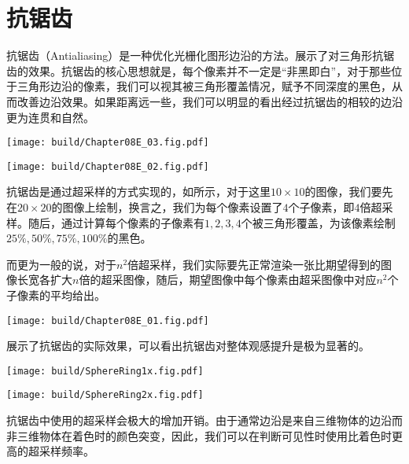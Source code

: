 \section{抗锯齿}
抗锯齿（Antialiasing）是一种优化光栅化图形边沿的方法。展示了对三角形抗锯齿的效果。抗锯齿的核心思想就是，每个像素并不一定是“非黑即白”，对于那些位于三角形边沿的像素，我们可以视其被三角形覆盖情况，赋予不同深度的黑色，从而改善边沿效果。如果距离远一些，我们可以明显的看出经过抗锯齿的相较的边沿更为连贯和自然。

\begin{Figure}[抗锯齿的效果对比]
    \begin{FigureSub}[抗锯齿前]
        \texttt{[image: build/Chapter08E\_03.fig.pdf]}
    \end{FigureSub}
    \begin{FigureSub}[抗锯齿后]
        \texttt{[image: build/Chapter08E\_02.fig.pdf]}
    \end{FigureSub}
\end{Figure}

抗锯齿是通过超采样的方式实现的，如所示，对于这里$10\times 10$的图像，我们要先在$20\times 20$的图像上绘制，换言之，我们为每个像素设置了$4$个子像素，即$4$倍超采样。随后，通过计算每个像素的子像素有$1,2,3,4$个被三角形覆盖，为该像素绘制$25\%,50\%,75\%,100\%$的黑色。

而更为一般的说，对于$n^2$倍超采样，我们实际要先正常渲染一张比期望得到的图像长宽各扩大$n$倍的超采图像，随后，期望图像中每个像素由超采图像中对应$n^2$个子像素的平均给出。

\begin{Figure}[抗锯齿与超采样]
    \texttt{[image: build/Chapter08E\_01.fig.pdf]}
\end{Figure}

展示了抗锯齿的实际效果，可以看出抗锯齿对整体观感提升是极为显著的。

\begin{Figure}[抗锯齿的实际效果]
    \begin{FigureSub}[无抗锯齿]
        \texttt{[image: build/SphereRing1x.fig.pdf]}
    \end{FigureSub}
    \hspace{0.5cm}
    \begin{FigureSub}[有抗锯齿]
        \texttt{[image: build/SphereRing2x.fig.pdf]}
    \end{FigureSub}
\end{Figure}


抗锯齿中使用的超采样会极大的增加开销。由于通常边沿是来自三维物体的边沿而非三维物体在着色时的颜色突变，因此，我们可以在判断可见性时使用比着色时更高的超采样频率。
